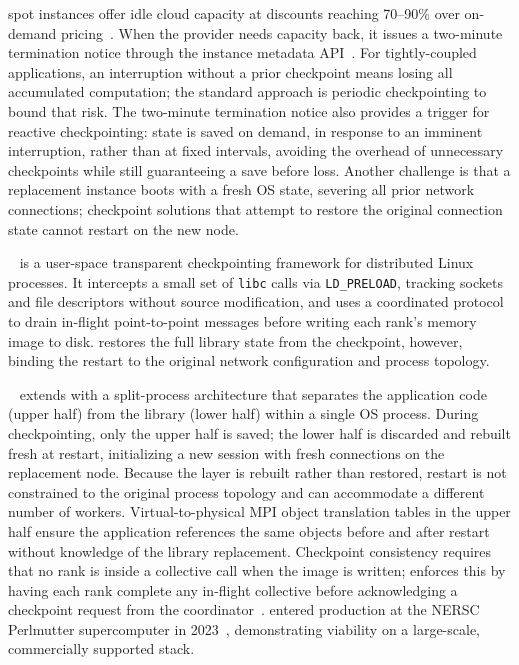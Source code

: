 \documentclass[conference]{IEEEtran}
\begin{document}
\AWS spot instances offer idle cloud capacity at discounts reaching 70--90\% over
on-demand pricing~\cite{aws2018spot}.
When the provider needs capacity back, it issues a two-minute termination notice through
the instance metadata API~\cite{aws2026spot_termination}.
For tightly-coupled \MPI applications, an interruption without a prior checkpoint means
losing all accumulated computation; the standard approach is periodic checkpointing to
bound that risk.
The two-minute termination notice also provides a trigger for reactive checkpointing:
state is saved on demand, in response to an imminent interruption, rather than at fixed
intervals, avoiding the overhead of unnecessary checkpoints while still guaranteeing a
save before loss.
Another challenge is that a replacement instance boots with a fresh OS state, severing
all prior network connections; checkpoint solutions that attempt to restore the original
connection state cannot restart on the new node.

\DMTCP~\cite{ansel2009dmtcp} is a user-space transparent checkpointing framework for
distributed Linux processes.
It intercepts a small set of \texttt{libc} calls via \texttt{LD\_PRELOAD}, tracking
sockets and file descriptors without source modification, and uses a coordinated
protocol to drain in-flight point-to-point messages before writing each rank's memory
image to disk.
\DMTCP restores the full \MPI library state from the checkpoint, however, binding the
restart to the original network configuration and process topology.

\MANA~\cite{garg2019mana,xu2023mana} extends \DMTCP with a split-process architecture
that separates the application code (upper half) from the \MPI library (lower half)
within a single OS process.
During checkpointing, only the upper half is saved; the lower half is discarded and
rebuilt fresh at restart, initializing a new \MPI session with fresh connections on the
replacement node.
Because the \MPI layer is rebuilt rather than restored, restart is not constrained to
the original process topology and can accommodate a different number of workers.
Virtual-to-physical MPI object translation tables in the upper half ensure the
application references the same \MPI objects before and after restart without knowledge
of the library replacement.
Checkpoint consistency requires that no rank is inside a collective call when the image
is written; \MANA enforces this by having each rank complete any in-flight collective
before acknowledging a checkpoint request from the coordinator~\cite{garg2019mana,xu2024mana}.
\MANA entered production at the NERSC Perlmutter supercomputer in 2023~\cite{xu2023mana},
demonstrating viability on a large-scale, commercially supported \MPI stack.
\end{document}
